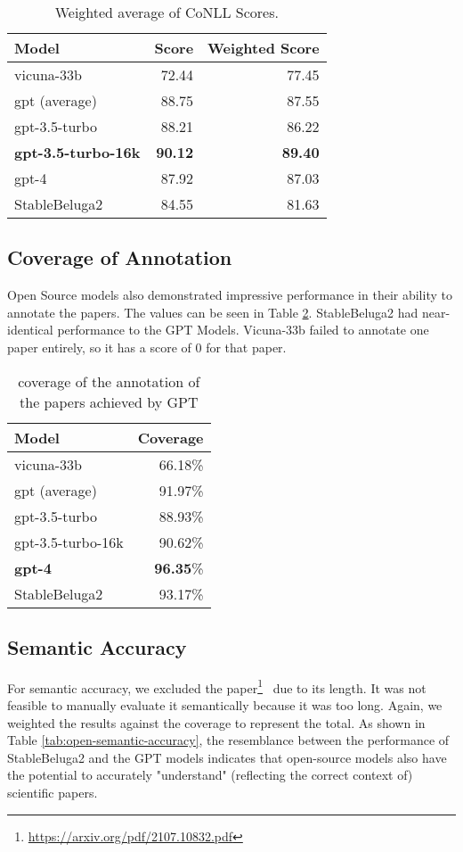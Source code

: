 \begin{table}[htpb]
  \centering
  \begin{tabular}{lrr}
    \hline
    Model & Score & Weighted Score \\
    \hline
    vicuna-33b & 72.44 & 77.45 \\
    gpt (average) & 88.75 & 87.55 \\
    gpt-3.5-turbo & 88.21 & 86.22 \\
    \textbf{gpt-3.5-turbo-16k} & \textbf{90.12} & \textbf{89.40} \\
    gpt-4 & 87.92 & 87.03 \\
    StableBeluga2 & 84.55 & 81.63 \\
    \hline
  \end{tabular}
  \caption[CoNLL Scores]{Weighted average of CoNLL Scores.}
  \label{tab:open-source-conll-score}
\end{table}


\subsection{Coverage of Annotation}
Open Source models also demonstrated impressive performance in their ability to annotate the papers. The values can be seen in Table \ref{tab:open-coverage}. StableBeluga2 had near-identical performance to the GPT Models. Vicuna-33b failed to annotate one paper entirely, so it has a score of 0 for that paper.

\begin{table}[htpb]
  \centering
  \begin{tabular}{lr}
    \hline
    Model & Coverage \\
    \hline
    vicuna-33b & 66.18\% \\
    gpt (average) & 91.97\% \\
    gpt-3.5-turbo & 88.93\% \\
    gpt-3.5-turbo-16k & 90.62\% \\
    \textbf{gpt-4} & \textbf{96.35}\% \\
    StableBeluga2 & 93.17\% \\
    \hline
  \end{tabular}
  \caption[Total coverage]{coverage of the annotation of the papers achieved by GPT}
  \label{tab:open-coverage}
\end{table}

\subsection{Semantic Accuracy}
For semantic accuracy, we excluded the paper\footnote{\url{https://arxiv.org/pdf/2107.10832.pdf}}~\citep{singleton2021logic} due to its length. It was not feasible to manually evaluate it semantically because it was too long. Again, we weighted the results against the coverage to represent the total. As shown in Table \ref{tab:open-semantic-accuracy}, the resemblance between the performance of StableBeluga2 and the GPT models indicates that open-source models also have the potential to accurately "understand" (reflecting the correct context of) scientific papers.

